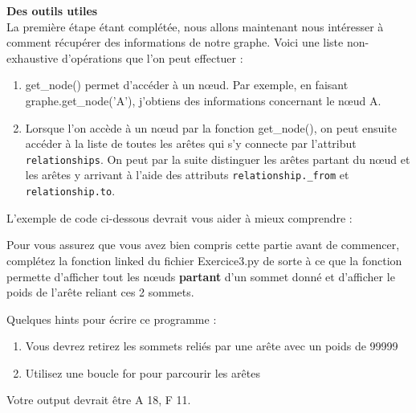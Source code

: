 \begin{Exercice}[10 minutes]\textbf{Des outils utiles}\\
    La première étape étant complétée, nous allons maintenant nous intéresser à comment récupérer des informations de notre graphe. Voici une liste non-exhaustive d'opérations que l'on peut effectuer :\\
    \begin{enumerate}
        \item get\_node() permet d'accéder à un nœud. Par exemple, en faisant graphe.get\_node('A'), j'obtiens des informations concernant le nœud A.
        \item Lorsque l'on accède à un nœud par la fonction get\_node(), on peut ensuite accéder à la liste de toutes les arêtes qui s'y connecte par l'attribut \lstinline{relationships}. On peut par la suite distinguer les arêtes partant du nœud et les arêtes y arrivant à l'aide des attributs \lstinline{relationship._from} et \lstinline{relationship.to}.
    \end{enumerate}
    
    L'exemple de code ci-dessous devrait vous aider à mieux comprendre :
    
    
    Pour vous assurez que vous avez bien compris cette partie avant de commencer, complétez la fonction linked du fichier Exercice3.py de sorte à ce que la fonction permette d'afficher tout les nœuds \textbf{partant} d'un sommet donné et d'afficher le poids de l'arête reliant ces 2 sommets.\\
    
    
    \begin{conseil}
        Quelques hints pour écrire ce programme :
        \begin{enumerate}
            \item Vous devrez retirez les sommets reliés par une arête avec un poids de 99999
            \item Utilisez une boucle for pour parcourir les arêtes
        \end{enumerate}
    Votre output devrait être A 18, F 11.
    \end{conseil}
    \begin{solution}
        
    \end{solution}
\end{Exercice}
\newpage
